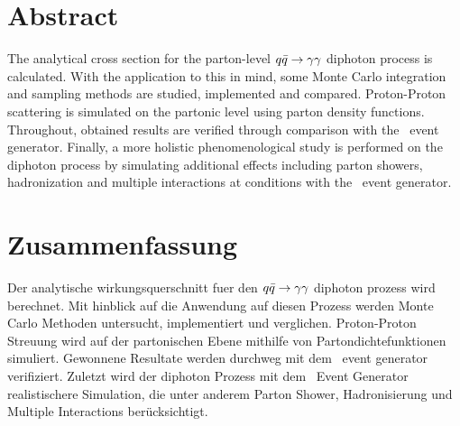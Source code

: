 \section*{Abstract}

The analytical cross section for the parton-level \(q\bar{q}\rightarrow\gamma\gamma\) diphoton
process is calculated.  With the application to this in mind, some
Monte Carlo integration and sampling methods are studied, implemented
and compared. Proton-Proton scattering is simulated on the partonic
level using parton density functions. Throughout, obtained results are
verified through comparison with the \sherpa\ event
generator. Finally, a more holistic phenomenological study is
performed on the diphoton process by simulating additional effects
including parton showers, hadronization and multiple interactions at
\lhc conditions with the \sherpa\ event generator.

\section*{Zusammenfassung}

Der analytische wirkungsquerschnitt fuer den \(q\bar{q}\rightarrow\gamma\gamma\) diphoton
prozess wird berechnet. Mit hinblick auf die Anwendung auf diesen
Prozess werden Monte Carlo Methoden untersucht, implementiert und
verglichen. Proton-Proton Streuung wird auf der partonischen Ebene
mithilfe von Partondichtefunktionen simuliert.  Gewonnene Resultate
werden durchweg mit dem \sherpa\ event generator verifiziert. Zuletzt
wird der diphoton Prozess mit dem \sherpa\ Event Generator
realistischere Simulation, die unter anderem Parton Shower,
Hadronisierung und Multiple Interactions ber\"ucksichtigt.

